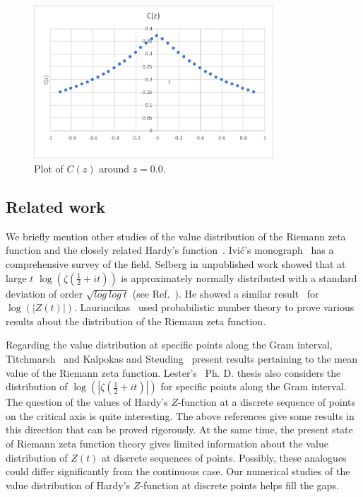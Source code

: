 \documentclass[twoside]{article}
\begin{document}
\begin{figure}
\centering
\includegraphics[width=0.8\textwidth]{Cz.pdf}
\caption[]{ 
 Plot of $C(z)$ around $z=0.0$. 
  }
\vspace{1mm}
\label{Cz}
\end{figure}


\subsection{\label{related}Related work}

We briefly mention other studies of the value distribution of the Riemann zeta function and 
the closely related Hardy's function~\cite{Hardy 1918}.  Ivi\'c's monograph~\cite{Ivic 2013} has a comprehensive survey of  the field.
Selberg in unpublished work showed that at large $t$ $\log (\zeta(\frac{1}{2} + it))$ is approximately normally distributed with a standard deviation of order $\sqrt{log~log~t}$ (see Ref.~\cite{Hejhal}). He showed a 
similar result~\cite{Selberg 1989, Selberg 1991} for $\log (|Z(t)|)$. Laurincikas~\cite{Laurincikas}  used probabilistic number theory to prove various results about the distribution of the Riemann zeta function.

Regarding the value distribution at specific points along the Gram interval, 
Titchmarsh~\cite{Titchmarsh 1934} and Kalpokas and Steuding~\cite{kalpokas 2009} present 
results pertaining to the
mean value of the Riemann zeta function. Lester's~\cite{Lester 2013} Ph. D. thesis also 
considers the distribution of $\log (|\zeta(\frac{1}{2} + it)|)$  for specific points along the Gram interval.  
The question of the values of Hardy's $Z$-function at a discrete sequence of points on the critical axis 
is quite interesting. The above references give some results in this direction that can be proved rigorously. 
At the same time, the present state of Riemann zeta function theory gives limited information 
about the value distribution of $Z(t)$ at discrete sequences of points. Possibly, these analogues 
could differ significantly from the continuous case.  
Our numerical studies of the value distribution of Hardy's $Z$-function at discrete points
helps fill the gaps. 
\end{document}
